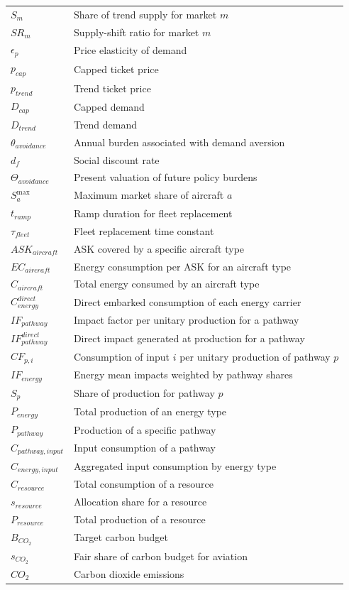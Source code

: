 \documentclass[
]{kaohandt}
\begin{document}
\begin{center}
\begin{tabular}{l l}
$S_m$ & Share of trend supply for market $m$ \\
$SR_m$ & Supply-shift ratio for market $m$ \\
$\epsilon_p$ & Price elasticity of demand \\
$p_{cap}$ & Capped ticket price \\
$p_{trend}$ & Trend ticket price \\
$D_{cap}$ & Capped demand \\
$D_{trend}$ & Trend demand \\
$\theta_{avoidance}$ & Annual burden associated with demand aversion \\
$d_f$ & Social discount rate \\
$\Theta_{avoidance}$ & Present valuation of future policy burdens \\
$S^{\max}_{a}$ & Maximum market share of aircraft $a$ \\
$t_{ramp}$ & Ramp duration for fleet replacement \\
$\tau_{fleet}$ & Fleet replacement time constant \\
$ASK_{aircraft}$ & ASK covered by a specific aircraft type \\
$EC_{aircraft}$ & Energy consumption per ASK for an aircraft type \\
$C_{aircraft}$ & Total energy consumed by an aircraft type \\
$C^{direct}_{energy}$ & Direct embarked consumption of each energy carrier \\
$IF_{pathway}$ & Impact factor per unitary production for a pathway \\
$IF^{direct}_{pathway}$ & Direct impact generated at production for a pathway \\
$CF_{p,i}$ & Consumption of input $i$ per unitary production of pathway $p$ \\
$IF_{energy}$ & Energy mean impacts weighted by pathway shares \\
$S_p$ & Share of production for pathway $p$ \\
$P_{energy}$ & Total production of an energy type \\
$P_{pathway}$ & Production of a specific pathway \\
$C_{pathway,input}$ & Input consumption of a pathway \\
$C_{energy,input}$ & Aggregated input consumption by energy type \\
$C_{resource}$ & Total consumption of a resource \\
$s_{resource}$ & Allocation share for a resource \\
$P_{resource}$ & Total production of a resource \\
$B_{CO_2}$ & Target carbon budget \\
$s_{CO_2}$ & Fair share of carbon budget for aviation \\
$CO_2$ & Carbon dioxide emissions \\
\bottomrule
\end{tabular}
\end{center}
\end{document}
